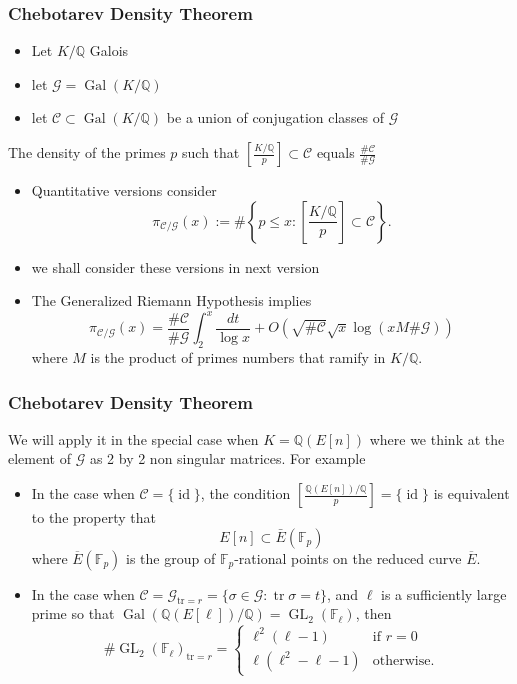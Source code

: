 \documentclass[10pt,final]{beamer} %
\newcommand{\Q}{\mathbb Q}
\newcommand{\F}{\mathbb F}
\theoremstyle{definition}
\begin{document}
\begin{frame}
\frametitle{Chebotarev Density Theorem} 

\begin{itemize}[<+-| alert@+>]
 \item Let $K/\Q$  Galois  
 \item let $\mathcal G=\operatorname{Gal}(K/\Q)$
 \item let $\mathcal C\subset\operatorname{Gal}(K/\Q)$ be a union of conjugation classes of 
$\mathcal G$
\end{itemize}\pause


\begin{theorem}
The density of the primes $p$ such that 
$\left[\frac{K/\Q}p\right]\subset \mathcal C$ equals $\frac{\#\mathcal C}{\#\mathcal G}$ 
\end{theorem}\pause

\begin{itemize}[<+-| alert@+>]
 \item Quantitative versions consider
$$\pi_{\mathcal C/\mathcal G}(x):=\#\left\{p\le x: \left[\frac{K/\Q}p\right]\subset \mathcal C\right\}.$$
\item we shall consider these versions in next version 
\item The Generalized Riemann Hypothesis implies
$$\pi_{\mathcal C/\mathcal G}(x)=
\frac{\#\mathcal C}{\#\mathcal G}\int_2^x\frac{dt}{\log x}+O\left(\sqrt{\#\mathcal C}\sqrt{x}\log(xM\#\mathcal G)\right)$$
where $M$ is the product of primes numbers that ramify in $K/\Q$.

\end{itemize}
\end{frame}

\begin{frame}
\frametitle{Chebotarev Density Theorem} 

We will apply it in the special case when $K=\Q(E[n])$ where we think at the element of $\mathcal G$ as 2 by 2 non singular matrices. For example\pause
\begin{itemize}[<+-| alert@+>]
 \item In the case when $\mathcal C=\{\operatorname{id}\}$, the condition $\left[\frac{\Q(E[n])/\Q}p\right]=\{\operatorname{id}\}$ is equivalent
to the property that 
$$E[n]\subset \bar{E}(\F_p)$$
where $\overline E(\F_p)$ is the group of $\F_p$-rational points on the reduced curve $\overline E$.
\item In the case when $\mathcal C=\mathcal G_{\text{tr}=r}=\{\sigma\in\mathcal G:\operatorname{tr}\sigma=t\}$, and $\ell$ is a sufficiently large prime so that $\operatorname{Gal}(\Q(E[\ell])/\Q)=
\operatorname{GL}_2(\F_\ell)$, then
$$\#\operatorname{GL}_2(\F_\ell)_{\text{tr}=r}=\begin{cases}
                   \ell^2(\ell-1) & \text{if } r=0\\
                   \ell(\ell^2-\ell-1) & \text{otherwise.}
                  \end{cases}
$$
\end{itemize}

\end{frame}
\end{document}
